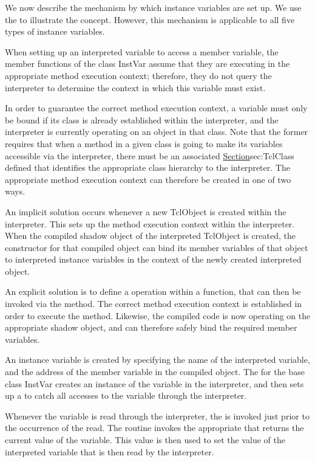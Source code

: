 We now describe the mechanism by which instance variables are set up.
We use the 
to illustrate the concept.
However, this mechanism is applicable to all five types of instance variables.

When setting up an interpreted variable to access a member variable,
the member functions of the class InstVar assume that they are executing
in the appropriate method execution context;
therefore, they do not query the interpreter to determine the context in
which this variable must exist.

In order to guarantee the correct method execution context,
a variable must only be bound if its class is already established within
the interpreter, and
the interpreter is currently operating on an object in that class.
Note that the former requires that when a method in a given class is
going to make its variables accessible via the interpreter,
there must be an associated 
\href{class TclClass}{Section}{sec:TclClass}
defined that identifies the appropriate class hierarchy to the interpreter.
The appropriate method execution context can therefore be created in one
of two ways.

An implicit solution occurs whenever a new TclObject is created within
the interpreter.
This sets up the method execution context within the interpreter.
When the compiled shadow object of the interpreted TclObject is created,
the constructor for that compiled object can bind its member variables
of that object
to interpreted instance variables in the context of the newly created
interpreted object.

An explicit solution is to define a  operation
within a  function, that can then be invoked via the
 method.
The correct method execution context is established in order to execute
the  method.
Likewise, the compiled code is now operating on the appropriate
shadow object, and can therefore safely bind the required member variables.

An instance variable is created by specifying the name of the
interpreted variable, and the address of the member variable in the
compiled object.
The
for the base class InstVar 
creates an instance of the variable in the interpreter,
and then sets up a
to  catch all accesses to the variable through the interpreter.

Whenever the variable is read through the interpreter, the
is invoked just prior to the occurrence of the read.
The routine invokes the appropriate
that returns the current value of the variable.
This value is then used to set the value of the interpreted variable
that is then read by the interpreter.

